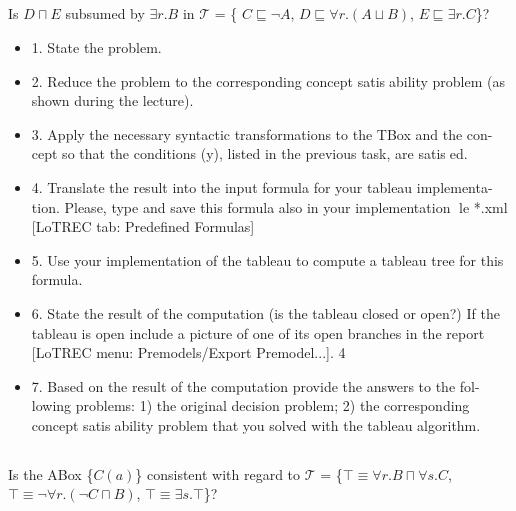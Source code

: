 \documentclass[11pt]{article} %
\begin{document}
\subsection{}

\begin{center}
Is $D \sqcap E$ subsumed by $\exists r.B$ in $\mathcal{T}$ = \{ $C \sqsubseteq \neg A$, $D \sqsubseteq \forall r.(A \sqcup B)$, $E \sqsubseteq \exists r.C$\}?
\end{center}

\begin{itemize}

\item 1. State the problem.
\item 2. Reduce the problem to the corresponding concept satisability problem
(as shown during the lecture).
\item 3. Apply the necessary syntactic transformations to the TBox and the con-
cept so that the conditions (y), listed in the previous task, are satised.
\item 4. Translate the result into the input formula for your tableau implementa-
tion. Please, type and save this formula also in your implementation le
*.xml [LoTREC tab: Predefined Formulas]
\item 5. Use your implementation of the tableau to compute a tableau tree for this
formula.
\item 6. State the result of the computation (is the tableau closed or open?) If the
tableau is open include a picture of one of its open branches in the report
[LoTREC menu: Premodels/Export Premodel...].
4
\item 7. Based on the result of the computation provide the answers to the fol-
lowing problems: 1) the original decision problem; 2) the corresponding
concept satisability problem that you solved with the tableau algorithm.

\end{itemize}

\subsection{}

\begin{center}
Is the ABox \{$C(a)$\} consistent with regard to $\mathcal{T}$ = \{$\top \equiv \forall r.B \sqcap \forall s.C$, $\top \equiv \neg \forall r.(\neg C \sqcap B)$, $\top \equiv \exists s.\top$\}?
\end{center}
\end{document}
